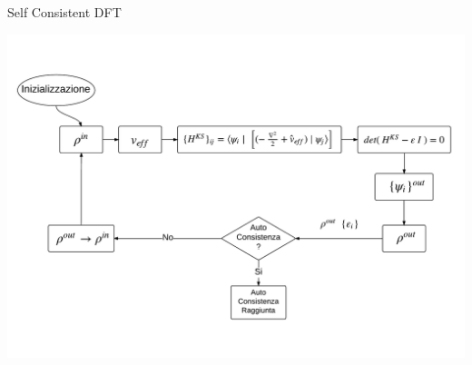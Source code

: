 \documentclass[8pt]{beamer}
\begin{document}
\begin{frame}{Self Consistent DFT}
\begin{center}
	\includegraphics[width=\textwidth]{beam_SCF_0.pdf}	
\end{center}
\end{frame}



\def \inputPos {3}
\def \electronsPos {4}
\def \cegtergPos {5}
\def \hpsiPos {6}
\def \cdiaghgPos {7}
\def \sumbandPos {8}
\def \fftPos {9}
\def \fftscatterPos {10}
\def \scfPicWidth {1.1}
\def \scfPicHeight {0.62}
\end{document}
